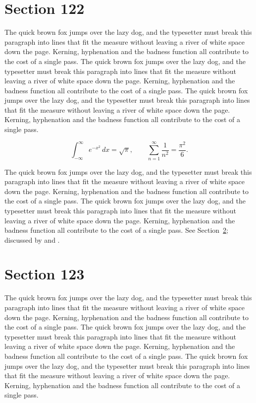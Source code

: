 \documentclass{article}
\begin{document}
\section{Section 122}
\label{sec:122}
The quick brown fox jumps over the lazy dog, and the typesetter must break this paragraph into lines that fit the measure without leaving a river of white space down the page. Kerning, hyphenation and the badness function all contribute to the cost of a single pass. The quick brown fox jumps over the lazy dog, and the typesetter must break this paragraph into lines that fit the measure without leaving a river of white space down the page. Kerning, hyphenation and the badness function all contribute to the cost of a single pass. The quick brown fox jumps over the lazy dog, and the typesetter must break this paragraph into lines that fit the measure without leaving a river of white space down the page. Kerning, hyphenation and the badness function all contribute to the cost of a single pass. 

\begin{equation}\label{eq:122}
\int_{-\infty}^{\infty} e^{-x^{2}}\,dx = \sqrt{\pi}, \qquad
\sum_{n=1}^{\infty} \frac{1}{n^{2}} = \frac{\pi^{2}}{6}.
\end{equation}

The quick brown fox jumps over the lazy dog, and the typesetter must break this paragraph into lines that fit the measure without leaving a river of white space down the page. Kerning, hyphenation and the badness function all contribute to the cost of a single pass. The quick brown fox jumps over the lazy dog, and the typesetter must break this paragraph into lines that fit the measure without leaving a river of white space down the page. Kerning, hyphenation and the badness function all contribute to the cost of a single pass. 
See Section~\ref{sec:123}; discussed by \textcite{k3} and \textcite{l5}.
\section{Section 123}
\label{sec:123}
The quick brown fox jumps over the lazy dog, and the typesetter must break this paragraph into lines that fit the measure without leaving a river of white space down the page. Kerning, hyphenation and the badness function all contribute to the cost of a single pass. The quick brown fox jumps over the lazy dog, and the typesetter must break this paragraph into lines that fit the measure without leaving a river of white space down the page. Kerning, hyphenation and the badness function all contribute to the cost of a single pass. The quick brown fox jumps over the lazy dog, and the typesetter must break this paragraph into lines that fit the measure without leaving a river of white space down the page. Kerning, hyphenation and the badness function all contribute to the cost of a single pass. 
\end{document}
